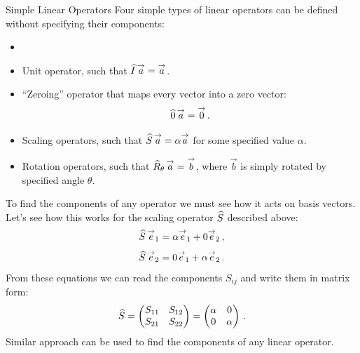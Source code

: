 \begin{mybio}{Simple Linear Operators}
Four simple types of linear operators can be defined without specifying their
components:
\begin{itemize}
  \item\phantom{x}
\item Unit operator, such that $\widehat{I}\,\overset{\rightarrow}{a}=\overset{\rightarrow}{a}$.
\item ``Zeroing'' operator that maps every vector into a zero
  vector:
  \[
  \widehat{0}\, \overset{\rightarrow}{a} = \overset{\rightarrow}{0}\,.
  \]
\item Scaling operators, such that $\widehat{S}\,\overset{\rightarrow}{a} = \alpha\overset{\rightarrow}{a}$
  for some specified value $\alpha$.
\item Rotation operators, such that $\widehat{R}_\theta\,\overset{\rightarrow}{a} = \overset{\rightarrow}{b}$, where
  $\vec{b}$ is simply rotated by specified angle $\theta$.
\end{itemize}
To find the components of any operator we must see how it acts on
basis vectors. Let's see how this works for the scaling operator
$\widehat{S}$ described above:
\[
\widehat{S}\,\overset{\rightarrow}{e}_1 = \alpha\overset{\rightarrow}{e}_1 + 0\overset{\rightarrow}{e}_2\,,
\]
\[
\widehat{S}\,\overset{\rightarrow}{e}_2 = 0\overset{\rightarrow}{e}_1 + \alpha\overset{\rightarrow}{e}_2\,.
\]
From these equations we can read the components $S_{ij}$ and write
them in matrix form:
\[
\widehat{S} =
\begin{pmatrix}
  S_{11} & S_{12}\\
  S_{21} & S_{22}
\end{pmatrix} =
\begin{pmatrix}
  \alpha & 0\\
  0 & \alpha
\end{pmatrix}\,.
\]
Similar approach can be used to find the components of any linear operator.
\end{mybio}


